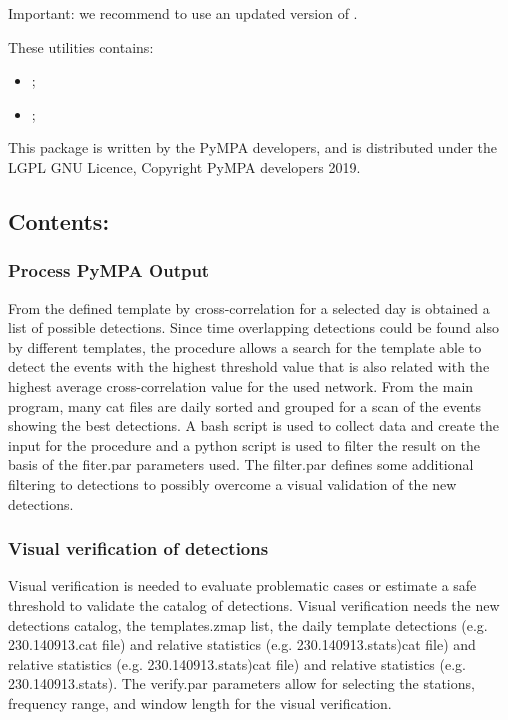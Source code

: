 \documentclass[a4paper,10pt,english]{sphinxmanual}
\begin{document}
Important: we recommend to use an updated version of .

These utilities contains:
\begin{itemize}
\item {} 
{\hyperref[\detokenize{sub/output.process_detections::doc}]{}};

\item {} 
{\hyperref[\detokenize{sub/output.verify_detection::doc}]{}};

\end{itemize}

This package is written by the PyMPA developers, and is distributed under the LGPL GNU Licence, Copyright PyMPA developers 2019.


\subsection{Contents:}
\label{\detokenize{output:contents}}

\subsubsection{Process PyMPA Output}
\label{\detokenize{sub/output.process_detections:process-pympa-output}}\label{\detokenize{sub/output.process_detections::doc}}
From the defined template by cross-correlation for a selected day is obtained a list of possible detections.
Since time overlapping detections could be found also by different templates, the procedure allows a search for
the template able to detect the events with the highest threshold value that is also related with the highest
average cross-correlation value for the used network. From the main program, many cat files are daily sorted
and grouped for a scan of the events showing the best detections. A bash script is used to collect data and create the input for the procedure
and a python script is used to filter the result on the basis of the fiter.par parameters used. The filter.par defines
some additional filtering to detections to possibly overcome a visual validation of the new detections.


\subsubsection{Visual verification of detections}
\label{\detokenize{sub/output.verify_detection:visual-verification-of-detections}}\label{\detokenize{sub/output.verify_detection::doc}}
Visual verification is needed to evaluate problematic cases or estimate a
safe threshold to validate the catalog of detections. Visual verification needs the new detections
catalog, the templates.zmap list, the daily template detections (e.g. 230.140913.cat file) and relative
statistics (e.g. 230.140913.stats)cat file) and relative
statistics (e.g. 230.140913.stats)cat file) and relative
statistics (e.g. 230.140913.stats). The verify.par parameters allow for selecting the stations, frequency range,
and window length for the visual verification.



\renewcommand{\indexname}{Index}
\printindex
\end{document}
